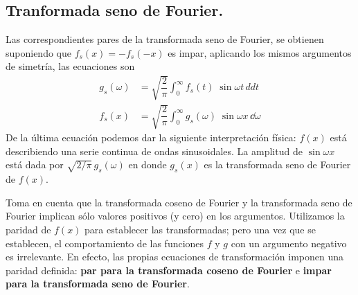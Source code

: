 \subsection{Tranformada seno de Fourier.}
Las correspondientes pares de la transformada seno de Fourier, se obtienen suponiendo que $f_{s}(x) = - f_{s}(-x)$ es impar, aplicando los mismos argumentos de simetría, las ecuaciones son
\begin{align}
g_{s} (\omega) &=  \sqrt{\dfrac{2}{\pi}} \int_{0}^{\infty} f_{s} (t) \; \sin \omega t \, dd{t} \label{eq:ecuacion_15_26} \\
f_{s} (x) &= \sqrt{\dfrac{2}{\pi}} \int_{0}^{\infty} g_{s} (\omega) \; \sin \omega x \, \dd{\omega}  \label{eq:ecuacion_15_27}
\end{align}
De la última ecuación podemos dar la siguiente interpretación física: $f(x)$ está describiendo una serie continua de ondas sinusoidales. La amplitud de $\sin \omega x$ está dada por $\sqrt{2 / \pi} \, g_{s} (\omega)$ en donde $g_{s}(x)$ es la transformada seno de Fourier de $f(x)$.
\par
Toma en cuenta que la transformada coseno de Fourier y la transformada seno de Fourier implican sólo valores positivos (y cero) en los argumentos. Utilizamos la paridad de $f (x)$ para establecer las transformadas; pero una vez que se establecen, el comportamiento de las funciones $f$ y $g$ con un argumento negativo es irrelevante. En efecto, las propias ecuaciones de transformación imponen una paridad definida: \textbf{par para la transformada coseno de Fourier} e \textbf{impar para la transformada seno de Fourier}.
